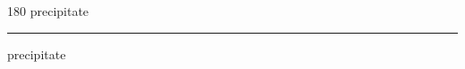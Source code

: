 
\begin{frame}
\begin{center}
\begin{turn}{180}
{\fontsize{2.5cm}{1em}\selectfont precipitate}
\end{turn}
\vspace{1em}\par  
\hrule
\vspace{1em}\par  
{\fontsize{2.5cm}{1em}\selectfont precipitate}
\end{center}
\end{frame}
